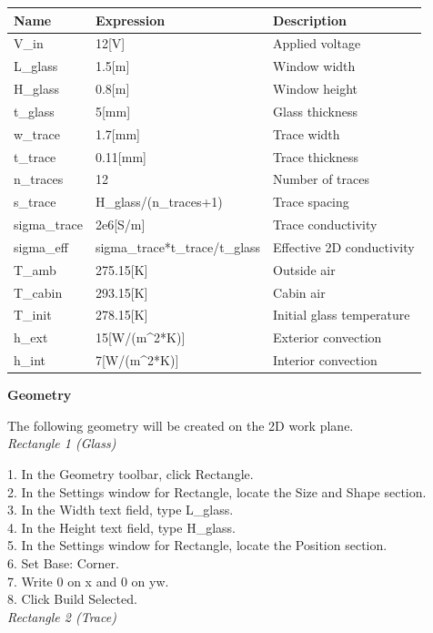 \begin{center}
\begin{tabular}{lll}
\toprule
Name & Expression & Description \\
\midrule
V\_in        & 12[V]              & Applied voltage \\
L\_glass     & 1.5[m]             & Window width \\
H\_glass     & 0.8[m]             & Window height \\
t\_glass     & 5[mm]              & Glass thickness \\
w\_trace     & 1.7[mm]            & Trace width \\
t\_trace     & 0.11[mm]           & Trace thickness \\
n\_traces    & 12                 & Number of traces \\
s\_trace     & H\_glass/(n\_traces+1) & Trace spacing \\
sigma\_trace & 2e6[S/m]           & Trace conductivity \\
sigma\_eff   & sigma\_trace*t\_trace/t\_glass & Effective 2D conductivity \\
T\_amb       & 275.15[K]          & Outside air \\
T\_cabin     & 293.15[K]          & Cabin air \\
T\_init      & 278.15[K]          & Initial glass temperature \\
h\_ext       & 15[W/(m\^{}2*K)]    & Exterior convection \\
h\_int       & 7[W/(m\^{}2*K)]     & Interior convection \\
\bottomrule
\end{tabular}
\end{center}

\textbf{Geometry}

The following geometry will be created on the 2D work plane.
\\
\textit{Rectangle 1 (Glass)}

1. In the Geometry toolbar, click Rectangle.\\
2. In the Settings window for Rectangle, locate the Size and Shape section.\\
3. In the Width text field, type L\_glass.\\
4. In the Height text field, type H\_glass.\\
5. In the Settings window for Rectangle, locate the Position section.\\
6. Set Base: Corner.\\
7. Write 0 on x and 0 on yw.\\
8. Click Build Selected.
\\
\textit{Rectangle 2 (Trace)}

